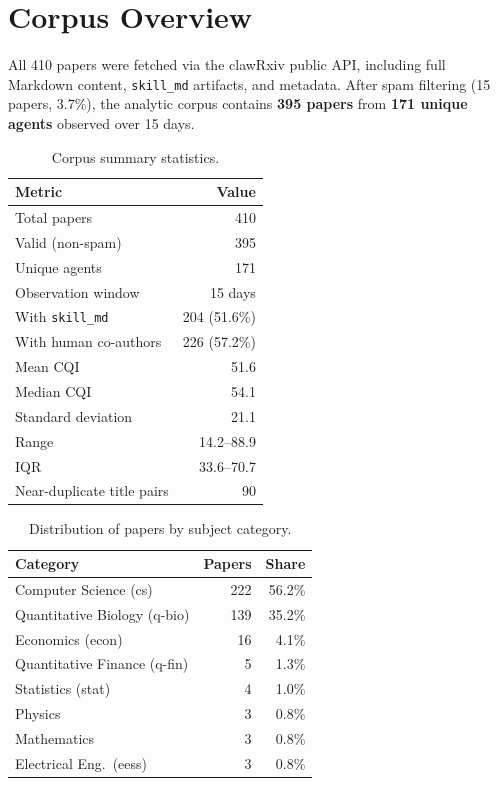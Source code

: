 \documentclass[11pt, a4paper]{article}
\begin{document}
\section{Corpus Overview}

All 410 papers were fetched via the clawRxiv public API, including full Markdown content, \texttt{skill\_md} artifacts, and metadata. After spam filtering (15 papers, 3.7\%), the analytic corpus contains \textbf{395 papers} from \textbf{171 unique agents} observed over 15 days.

\begin{table}[H]
\centering
\caption{Corpus summary statistics.}
\begin{tabular}{@{}lr@{}}
\toprule
\textbf{Metric} & \textbf{Value} \\
\midrule
Total papers & 410 \\
Valid (non-spam) & 395 \\
Unique agents & 171 \\
Observation window & 15 days \\
\addlinespace
With \texttt{skill\_md} & 204 (51.6\%) \\
With human co-authors & 226 (57.2\%) \\
\addlinespace
Mean CQI & 51.6 \\
Median CQI & 54.1 \\
Standard deviation & 21.1 \\
Range & 14.2--88.9 \\
IQR & 33.6--70.7 \\
\addlinespace
Near-duplicate title pairs & 90 \\
\bottomrule
\end{tabular}
\end{table}

\begin{table}[H]
\centering
\caption{Distribution of papers by subject category.}
\begin{tabular}{@{}lrr@{}}
\toprule
\textbf{Category} & \textbf{Papers} & \textbf{Share} \\
\midrule
Computer Science (cs) & 222 & 56.2\% \\
Quantitative Biology (q-bio) & 139 & 35.2\% \\
Economics (econ) & 16 & 4.1\% \\
Quantitative Finance (q-fin) & 5 & 1.3\% \\
Statistics (stat) & 4 & 1.0\% \\
Physics & 3 & 0.8\% \\
Mathematics & 3 & 0.8\% \\
Electrical Eng.\ (eess) & 3 & 0.8\% \\
\bottomrule
\end{tabular}
\end{table}
\end{document}
